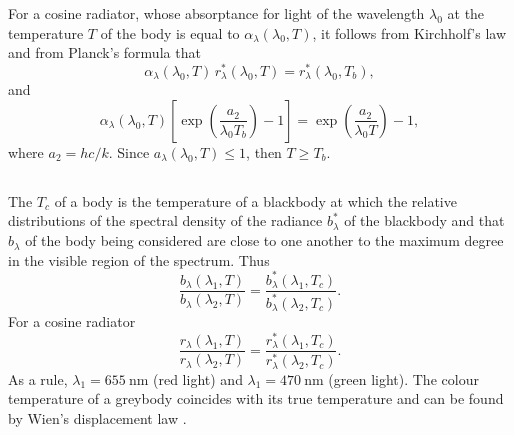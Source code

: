 For a cosine radiator, whose absorptance  for light of the wavelength  $\lambda_{0}$ at the temperature $T$ of the body is equal to $\alpha_{\lambda} (\lambda_{0}, T)$, it follows from Kirchholf's law  and from
Planck's formula  that
\begin{equation*}%
\alpha_{\lambda} (\lambda_{0}, T)\, r_{\lambda}^{*} (\lambda_{0}, T) =  r_{\lambda}^{*} (\lambda_{0}, T_{b}),
\end{equation*}
and
\begin{equation*}%
\alpha_{\lambda} (\lambda_{0}, T)\left[ \exp \left(\frac{a_{2}}{\lambda_{0}T_{b}}\right) - 1 \right] = \exp \left(\frac{a_{2}}{\lambda_{0}T}\right) - 1, 
\end{equation*}
where $a_{2} = hc/k$. Since $a_{\lambda}(\lambda_{0}, T) \leqslant 1$, then $T \geqslant T_{b}$.

\subsection{}\label{36.4.7} The  $T_{c}$ of a body is the temperature of a blackbody at which the relative distributions of the spectral density of the radiance $b_{\lambda}^{*}$ of the blackbody and that $b_{\lambda}$ of the body being considered are close to one another to the maximum degree in the visible region of the spectrum. Thus
\begin{equation*}%
\frac{b_{\lambda} (\lambda_{1}, T)}{b_{\lambda} (\lambda_{2}, T)} = \frac{b_{\lambda}^{*} (\lambda_{1}, T_{c})}{b_{\lambda}^{*} (\lambda_{2}, T_{c})} .
\end{equation*}
For a cosine radiator
\begin{equation*}%
\frac{r_{\lambda} (\lambda_{1}, T)}{r_{\lambda} (\lambda_{2}, T)} = \frac{r_{\lambda}^{*} (\lambda_{1}, T_{c})}{r_{\lambda}^{*} (\lambda_{2}, T_{c})} .
\end{equation*}
As a rule, $\lambda_{1} = \SI{655}{\nano\meter}$ (red light) and $\lambda_{1} = \SI{470}{\nano\meter}$ (green light). The colour temperature of a greybody  coincides with its true temperature and can be found by Wien's displacement law .



